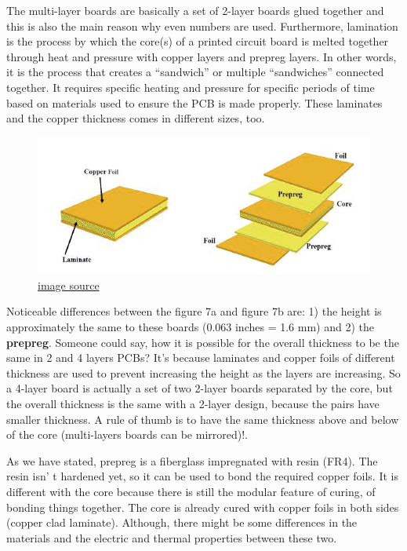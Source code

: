 \documentclass[final]{cubedoc}
\begin{document}
	The multi-layer boards are basically a set of 2-layer boards glued together and this is also the main reason why even numbers are used. Furthermore, lamination is the process by which the core(s) of a printed circuit board is melted together through heat and pressure with copper layers and prepreg layers. In other words, it is the process that creates a “sandwich” or multiple “sandwiches” connected together. It requires specific heating and pressure for specific periods of time based on materials used to ensure the PCB is made properly.  These laminates and the copper thickness comes in different sizes, too.
	
	
	
	\begin{figure}[h!]
		\centering
		\includegraphics[keepaspectratio, height=.25\textheight, width=\textwidth]{assets/multi_layer_laminate_2.png}
		\caption{\href{https://web.archive.org/web/20200814083836/https://www.pcbcart.com/article/content/surface-finish-intro-and-comparision.html}{image source}}
	\end{figure}
	
	Noticeable differences between the figure 7a and figure 7b are: 1) the height is approximately the same to these boards (0.063 inches = 1.6 mm) and 2) the \textbf{prepreg}. Someone could say, how it is possible for the overall thickness to be the same in 2 and 4 layers PCBs? It’s because laminates and copper foils of different thickness are used to prevent increasing the height as the layers are increasing. So a 4-layer board is actually a set of two 2-layer boards separated by  the core, but the overall thickness is the same with a 2-layer design, because the pairs have smaller thickness. A rule of thumb is to have the same thickness above and below of the core (multi-layers boards can be mirrored)!.
	
	As we have stated, prepreg is a fiberglass impregnated with resin (FR4). The resin isn'
	t hardened yet, so it can be used to bond the required copper foils. It is different with the core because there is still the modular feature of curing, of bonding things together. The core is already cured with copper foils in both sides (copper clad laminate). Although, there might be some differences in the materials and the electric and thermal properties between these two.
	
\end{document}
